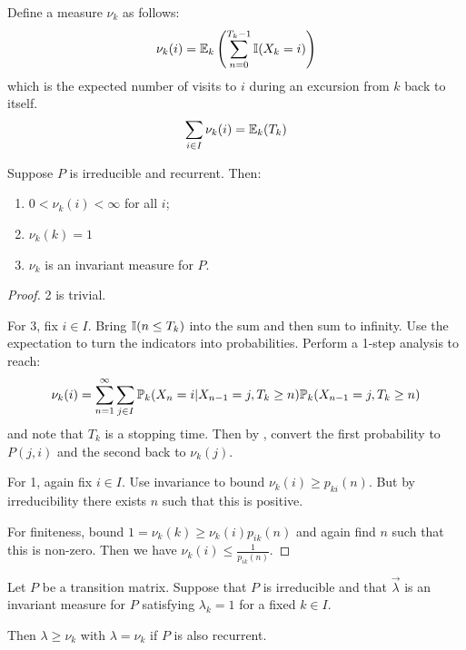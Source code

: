 \documentclass[../Main.tex]{subfiles}
\begin{document}
Define a measure $\nu_k$ as follows:
\begin{equation*}
    \nu_k(i) = \E_k \left(\sum_{n=0}^{T_k - 1}\ind{X_k = i}\right)
\end{equation*}
which is the expected number of visits to $i$ during an excursion from $k$ back to itself.
\begin{equation*}
    \sum_{i \in I} \nu_k(i) = \E_k(T_k)
\end{equation*}
\begin{theorem}
    Suppose $P$ is irreducible and recurrent. Then:
    \begin{enumerate}
        \item $0 < \nu_k(i) < \infty$ for all $i$;
        \item $\nu_k(k) = 1$
        \item $\nu_k$ is an invariant measure for $P$.
    \end{enumerate}
    \label{thmExpVisitsProps}
\end{theorem}
\begin{proof}
    2 is trivial.

    For $3$, fix $i \in I$. Bring $\ind{n \leq T_k}$ into the sum and then sum to infinity. Use the expectation to turn the indicators into probabilities. Perform a 1-step analysis to reach:
    \begin{equation*}
        \nu_k(i) = \sum_{n=1}^{\infty} \sum_{j \in I} \P_k(X_n = i | X_{n-1} = j, T_k \geq n)\P_k(X_{n-1} = j, T_k \geq n)
    \end{equation*}
    and note that $T_k$ is a stopping time. Then by , convert the first probability to $P(j, i)$ and the second back to $\nu_k(j)$.

    For 1, again fix $i \in I$. Use invariance to bound $\nu_k(i) \geq p_{ki}(n)$. But by irreducibility there exists $n$ such that this is positive.

    For finiteness, bound $1 = \nu_k(k) \geq \nu_k(i) p_{ik}(n)$ and again find $n$ such that this is non-zero. Then we have $\nu_k(i) \leq \frac{1}{p_{ik}(n)}$.
\end{proof}
\begin{theorem}[$\nu_k$ is unique]
    Let $P$ be a transition matrix. Suppose that $P$ is irreducible and that $\vec{\lambda}$ is an invariant measure for $P$ satisfying $\lambda_k = 1$ for a fixed $k \in I$.

    Then $\lambda \geq \nu_k$ with $\lambda = \nu_k$ if $P$ is also recurrent.
    \label{thmNuUnique}
\end{theorem}
\end{document}
